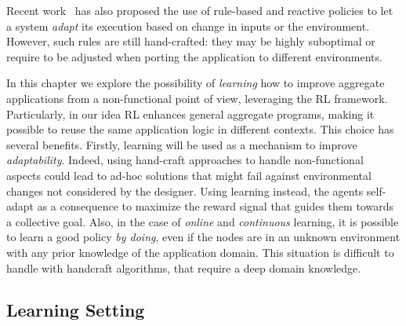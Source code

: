 Recent work~\cite{danilo2021lmcs} has also proposed the use of rule-based and reactive policies to let a system \emph{adapt} its execution based on change in inputs or the environment.
%
However, such rules are still hand-crafted: they may be highly suboptimal or require to be adjusted when porting the application to different environments.

In this chapter we explore the possibility of \emph{learning} 
 how to improve aggregate applications from a non-functional point of view, 
 leveraging the \ac{RL} framework.
%
Particularly, in our idea \ac{RL} enhances general aggregate programs, 
 making it possible to reuse the same application logic in different contexts.
%
This choice has several benefits.
 Firstly, learning will be used as a mechanism to improve \emph{adaptability}. 
 Indeed, using hand-craft approaches to handle non-functional aspects 
 could lead to ad-hoc solutions that might fail against environmental 
 changes not considered by the designer.
%
Using learning instead, the agents self-adapt as a consequence 
 to maximize the reward signal that guides them towards a collective goal. 
%
Also, in the case of \emph{online} and \emph{continuous} learning, 
 it is possible to learn a good policy \emph{by doing}, 
 even if the nodes are in an unknown environment with any prior knowledge of the application domain.
%
This situation is difficult to handle with handcraft algorithms, that require a deep domain knowledge.

\subsection{Learning Setting}\label{acsos2022:sec:learning-setting}

